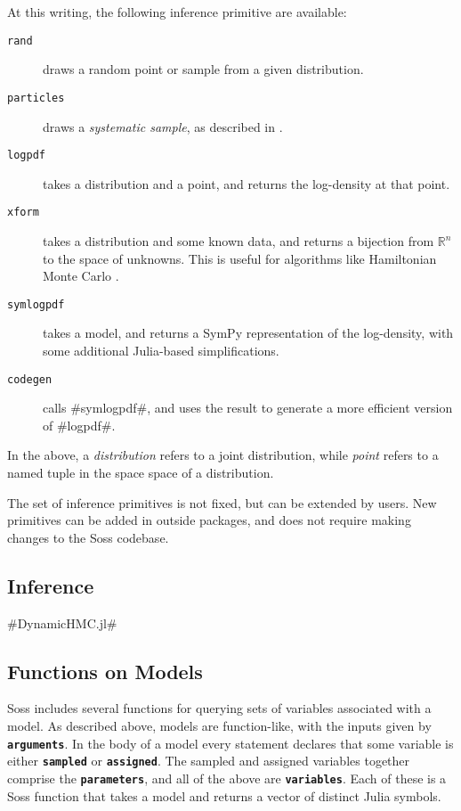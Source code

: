\documentclass[anonymous=false, %
               format=acmsmall, %
               review=true, %
               screen=true, %
               nonacm=true]{acmart}
\begin{document}
At this writing, the following inference primitive are available:

\begin{description}  
    \item[\texttt{rand}] draws a random point or sample from a given distribution.
    \item[\texttt{particles}] draws a \emph{systematic sample}, as described in \cite{Douc2005}.
    \item[\texttt{logpdf}] takes a distribution and a point, and returns the log-density at that point.
    \item[\texttt{xform}] takes a distribution and some known data, and returns a bijection from $\mathbb{R}^n$ to the space of unknowns. This is useful for algorithms like Hamiltonian Monte Carlo \cite{Neal2011}.
    \item[\texttt{symlogpdf}] takes a model, and returns a SymPy \cite{10.7717/peerj-cs.103} representation of the log-density, with some additional Julia-based simplifications.
    \item[\texttt{codegen}] calls \jl#symlogpdf#, and uses the result to generate a more efficient version of \jl#logpdf#.
\end{description}

In the above, a \emph{distribution} refers to a joint distribution, while \emph{point} refers to a named tuple in the space space of a distribution.


The set of inference primitives is not fixed, but can be extended by users. New primitives can be added in outside packages, and does not require making changes to the Soss codebase. 

\subsection{Inference}

\jl#DynamicHMC.jl# \cite{tamas_k_papp_2019_3590018}

\subsection{Functions on Models}

Soss includes several functions for querying sets of variables associated with a model. As described above, models are function-like, with the inputs given by {\bf \texttt{arguments}}. In the body of a model every statement declares that some variable is either {\bf \texttt{sampled}} or {\bf \texttt{assigned}}. The sampled and assigned variables together comprise the {\bf \texttt{parameters}}, and all of the above are {\bf \texttt{variables}}. Each of these is a Soss function that takes a model and returns a vector of distinct Julia symbols.
\end{document}
